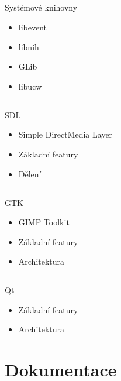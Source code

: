 \documentclass{beamer}
\begin{document}
\subsection{}
\begin{frame}{Systémové knihovny}
\begin{itemize}
\item libevent
\item libnih
\item GLib
\item libucw
\end{itemize}
\end{frame}

\subsection{}
\begin{frame}{SDL}
\begin{itemize}
\item Simple DirectMedia Layer
\item Základní featury
\item Dělení
\end{itemize}
\end{frame}

\subsection{}
\begin{frame}{GTK}
\begin{itemize}
\item GIMP Toolkit
\item Základní featury
\item Architektura
\end{itemize}
\end{frame}

\subsection{}
\begin{frame}{Qt}
\begin{itemize}
\item Základní featury
\item Architektura
\end{itemize}
\end{frame}


\section{Dokumentace}
\end{document}
